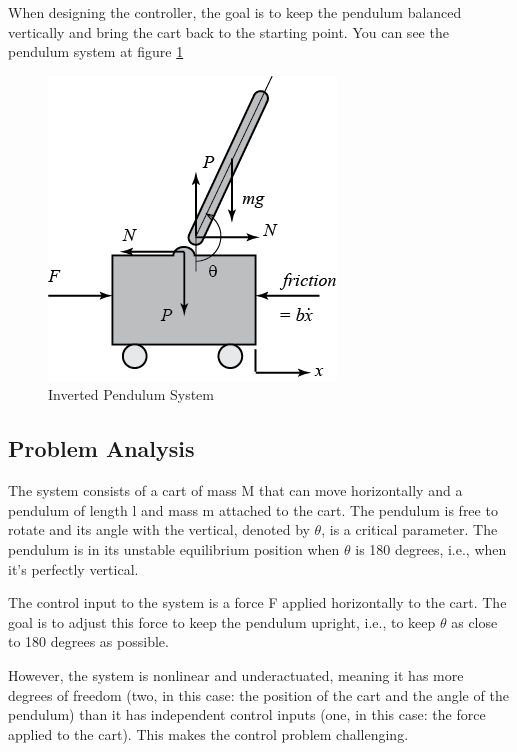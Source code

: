 \documentclass[11pt,twocolumn,twoside,lineno]{pnas-new}
\begin{document}
When designing the controller, the goal is to keep the pendulum balanced vertically and bring the cart back to the starting point. You can see the pendulum system at figure \ref{pendulum}
\begin{figure}[h]
       \centering
       \includegraphics[width=0.9\linewidth]{problem/pendulum.png}
       \caption{Inverted Pendulum System}
       \label{pendulum}
\end{figure}

\subsection{Problem Analysis}
The system consists of a cart of mass M that can move horizontally and a pendulum of length l and mass m attached to the cart. The pendulum is free to rotate and its angle with the vertical, denoted by $\theta$, is a critical parameter. The pendulum is in its unstable equilibrium position when $\theta$ is 180 degrees, i.e., when it's perfectly vertical. 

The control input to the system is a force F applied horizontally to the cart. The goal is to adjust this force to keep the pendulum upright, i.e., to keep $\theta$ as close to 180 degrees as possible. 

However, the system is nonlinear and underactuated, meaning it has more degrees of freedom (two, in this case: the position of the cart and the angle of the pendulum) than it has independent control inputs (one, in this case: the force applied to the cart). This makes the control problem challenging.
\end{document}
